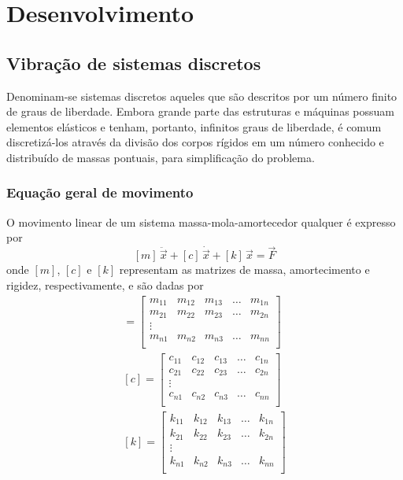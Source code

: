 \documentclass[12pt,openright,oneside,a4paper,
	chapter=TITLE,section=TITLE,
	english,brazil]{abntex2}
\begin{document}
	\chapter{Desenvolvimento}
	
	\section{Vibração de sistemas discretos}
	Denominam-se sistemas discretos aqueles que são descritos por um número finito de graus de liberdade. Embora grande parte das estruturas e máquinas possuam elementos elásticos e tenham, portanto, infinitos graus de liberdade, é comum discretizá-los através da divisão dos corpos rígidos em um número conhecido e distribuído de massas pontuais, para simplificação do problema. 
	
	\subsection{Equação geral de movimento}
	O movimento linear de um sistema massa-mola-amortecedor qualquer é expresso por \cite{rao:2008}
	\begin{equation} \label{eqn:discr:movimento}
		[m]\,\ddot{\vec{x}} + [c]\,\dot{\vec{x}} + [k]\,\vec{x} = \vec{F}
	\end{equation}
	onde $ [m] $, $ [c] $ e $ [k] $ representam as matrizes de massa, amortecimento e rigidez, respectivamente, e são dadas por
	\begin{gather} 
		[m] = 
		\begin{bmatrix} \label{eqn:matr:massa}
			m_{11} & m_{12} & m_{13} & \dots & m_{1n}\\
			m_{21} & m_{22} & m_{23} & \dots & m_{2n}\\
			\vdots\\
			m_{n1} & m_{n2} & m_{n3} & \dots & m_{nn}\\
		\end{bmatrix}\\		
		[c] = 
		\begin{bmatrix} \label{eqn:matr:amort}
			c_{11} & c_{12} & c_{13} & \dots & c_{1n}\\
			c_{21} & c_{22} & c_{23} & \dots & c_{2n}\\
			\vdots\\
			c_{n1} & c_{n2} & c_{n3} & \dots & c_{nn}\\
		\end{bmatrix}\\
		[k] = 
		\begin{bmatrix} \label{eqn:matr:rigid}
			k_{11} & k_{12} & k_{13} & \dots & k_{1n}\\
			k_{21} & k_{22} & k_{23} & \dots & k_{2n}\\
			\vdots\\
			k_{n1} & k_{n2} & k_{n3} & \dots & k_{nn}\\
		\end{bmatrix}
	\end{gather}
\end{document}
